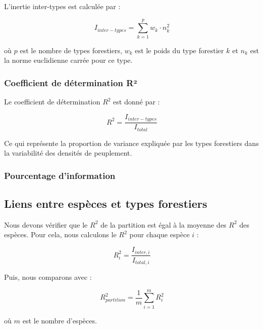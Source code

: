 \documentclass[
]{article}
\begin{document}
L'inertie inter-types est calculée par :

\[
I_{inter-types} = \sum_{k=1}^{p} w_{k} \cdot n_{k}^{2}
\]

où \(p\) est le nombre de types forestiers, \(w_{k}\) est le poids du
type forestier \(k\) et \(n_{k}\) est la norme euclidienne carrée pour
ce type.

\hypertarget{coefficient-de-duxe9termination-ruxb2}{%
\subsubsection{Coefficient de détermination
R²}\label{coefficient-de-duxe9termination-ruxb2}}

Le coefficient de détermination \(R^2\) est donné par :

\[
R^2 = \frac{I_{inter-types}}{I_{total}}
\]

Ce qui représente la proportion de variance expliquée par les types
forestiers dans la variabilité des densités de peuplement.

\hypertarget{pourcentage-dinformation}{%
\subsubsection{Pourcentage
d'information}\label{pourcentage-dinformation}}

\hypertarget{liens-entre-espuxe8ces-et-types-forestiers}{%
\subsection{Liens entre espèces et types
forestiers}\label{liens-entre-espuxe8ces-et-types-forestiers}}

Nous devons vérifier que le \(R^2\) de la partition est égal à la
moyenne des \(R^2\) des espèces. Pour cela, nous calculons le \(R^2\)
pour chaque espèce \(i\) :

\[
R^2_{i} = \frac{I_{inter,i}}{I_{total,i}}
\]

Puis, nous comparons avec :

\[
R^2_{partition} = \frac{1}{m} \sum_{i=1}^{m} R^2_{i}
\]

où \(m\) est le nombre d'espèces.
\end{document}
